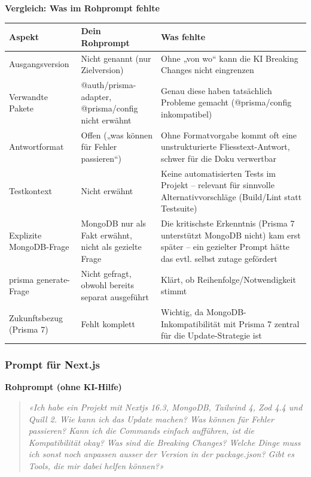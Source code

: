 \documentclass[11pt,a4paper]{article}
\newcommand{\minihead}[1]{\par\needspace{5\baselineskip}\noindent\textbf{#1}\par\nobreak}
\let\oldsubsubsection\subsubsection
\renewcommand{\subsubsection}{\needspace{6\baselineskip}\oldsubsubsection}
\begin{document}
\minihead{Vergleich: Was im Rohprompt fehlte}
\begin{center}
\small
\begin{tabularx}{\textwidth}{>{\raggedright\arraybackslash}p{3cm} >{\raggedright\arraybackslash}X >{\raggedright\arraybackslash}X}
\toprule
\textbf{Aspekt} & \textbf{Dein Rohprompt} & \textbf{Was fehlte} \\
\midrule
Ausgangsversion & Nicht genannt (nur Zielversion) & Ohne „von wo“ kann die KI Breaking Changes nicht eingrenzen \\
Verwandte Pakete & @auth/prisma-adapter, @prisma/config nicht erwähnt & Genau diese haben tatsächlich Probleme gemacht (@prisma/config inkompatibel) \\
Antwortformat & Offen („was können für Fehler passieren“) & Ohne Formatvorgabe kommt oft eine unstrukturierte Fliesstext-Antwort, schwer für die Doku verwertbar \\
Testkontext & Nicht erwähnt & Keine automatisierten Tests im Projekt – relevant für sinnvolle Alternativvorschläge (Build/Lint statt Testsuite) \\
Explizite MongoDB-Frage & MongoDB nur als Fakt erwähnt, nicht als gezielte Frage & Die kritischste Erkenntnis (Prisma 7 unterstützt MongoDB nicht) kam erst später – ein gezielter Prompt hätte das evtl. selbst zutage gefördert \\
prisma generate-Frage & Nicht gefragt, obwohl bereits separat ausgeführt & Klärt, ob Reihenfolge/Notwendigkeit stimmt \\
Zukunftsbezug (Prisma 7) & Fehlt komplett & Wichtig, da MongoDB-Inkompatibilität mit Prisma 7 zentral für die Update-Strategie ist \\
\bottomrule
\end{tabularx}
\end{center}

\subsubsection{Prompt für Next.js}
\minihead{Rohprompt (ohne KI-Hilfe)}
\begin{quote}
\textit{«Ich habe ein Projekt mit Nextjs 16.3, MongoDB, Tailwind 4, Zod 4.4 und Quill 2. Wie kann ich das Update machen? Was können für Fehler passieren? Kann ich die Commands einfach aufführen, ist die Kompatibilität okay? Was sind die Breaking Changes? Welche Dinge muss ich sonst noch anpassen ausser der Version in der package.json? Gibt es Tools, die mir dabei helfen können?»}
\end{quote}
\end{document}
